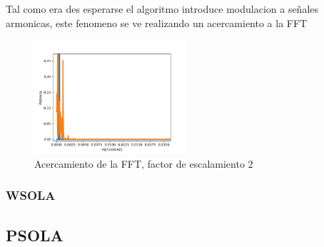 \documentclass[../ASSD_TP2.tex]{subfiles}
\begin{document}
Tal como era des esperarse el algoritmo introduce modulacion a se\~nales armonicas, este fenomeno se ve realizando un acercamiento a la FFT

\begin{figure}[H]
  \centering
   \includegraphics[width=0.5\textwidth]{figures/zoom.png}
  \caption{Acercamiento de la FFT, factor de escalamiento 2}
\end{figure}

\subsubsection*{WSOLA}

\subsection*{PSOLA}
\end{document}
